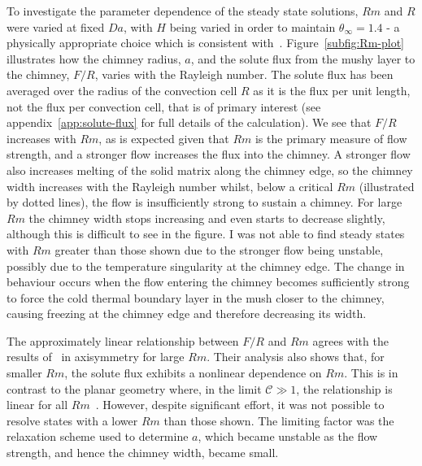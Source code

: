 \documentclass[11pt,twocolumn]{article}
\newcommand{\CompRatio}{\mathscr{C}}
\begin{document}
To investigate the parameter dependence of the steady state solutions, $Rm$ and $R$ were varied at fixed $Da$, with $H$ being varied in order to maintain $\theta_\infty=1.4$ - a physically appropriate choice which is consistent with~\citet*{rees-jones-worster-13}. Figure~\ref{subfig:Rm-plot} illustrates how the chimney radius, $a$, and the solute flux from the mushy layer to the chimney, $F/R$, varies with the Rayleigh number. The solute flux has been averaged over the radius of the convection cell $R$ as it is the flux per unit length, not the flux per convection cell, that is of primary interest (see appendix~\ref{app:solute-flux} for full details of the calculation). We see that $F/R$ increases with $Rm$, as is expected given that $Rm$ is the primary measure of flow strength, and a stronger flow increases the flux into the chimney. A stronger flow also increases melting of the solid matrix along the chimney edge, so the chimney width increases with the Rayleigh number whilst, below a critical $Rm$ (illustrated by dotted lines), the flow is insufficiently strong to sustain a chimney. For large $Rm$ the chimney width stops increasing and even starts to decrease slightly, although this is difficult to see in the figure. I was not able to find steady states with $Rm$ greater than those shown due to the stronger flow being unstable, possibly due to the temperature singularity at the chimney edge. The change in behaviour occurs when the flow entering the chimney becomes sufficiently strong to force the cold thermal boundary layer in the mush closer to the chimney, causing freezing at the chimney edge and therefore decreasing its width. 

The approximately linear relationship between $F/R$ and $Rm$ agrees with the results of~\citet*{rees-jones-worster-13} in axisymmetry for large $Rm$. Their analysis also shows that, for smaller $Rm$, the solute flux exhibits a nonlinear dependence on $Rm$. This is in contrast to the planar geometry where, in the limit $\CompRatio \gg 1$, the relationship is linear for all $Rm$~\citep*{wells-et-al-13}. However, despite significant effort, it was not possible to resolve states with a lower $Rm$ than those shown. The limiting factor was the relaxation scheme used to determine $a$, which became unstable as the flow strength, and hence the chimney width, became small.
\end{document}
